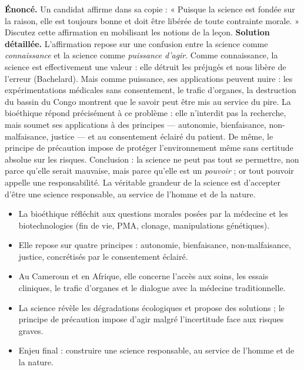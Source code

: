 \documentclass[11pt]{article}
\begin{document}
\begin{exoresolu}
\textbf{Énoncé.} Un candidat affirme dans sa copie : « Puisque la science est fondée sur la raison, elle est toujours bonne et doit être libérée de toute contrainte morale. » Discutez cette affirmation en mobilisant les notions de la leçon.
\tcblower
\textbf{Solution détaillée.} L'affirmation repose sur une confusion entre la science comme \emph{connaissance} et la science comme \emph{puissance d'agir}. Comme connaissance, la science est effectivement une valeur : elle détruit les préjugés et nous libère de l'erreur (Bachelard). Mais comme puissance, ses applications peuvent nuire : les expérimentations médicales sans consentement, le trafic d'organes, la destruction du bassin du Congo montrent que le savoir peut être mis au service du pire. La bioéthique répond précisément à ce problème : elle n'interdit pas la recherche, mais soumet ses applications à des principes — autonomie, bienfaisance, non-malfaisance, justice — et au consentement éclairé du patient. De même, le principe de précaution impose de protéger l'environnement même sans certitude absolue sur les risques. Conclusion : la science ne peut pas tout se permettre, non parce qu'elle serait mauvaise, mais parce qu'elle est un \emph{pouvoir} ; or tout pouvoir appelle une responsabilité. La véritable grandeur de la science est d'accepter d'être une science responsable, au service de l'homme et de la nature.
\end{exoresolu}

\begin{aretenir}
\begin{itemize}
\item La bioéthique réfléchit aux questions morales posées par la médecine et les biotechnologies (fin de vie, PMA, clonage, manipulations génétiques).
\item Elle repose sur quatre principes : autonomie, bienfaisance, non-malfaisance, justice, concrétisés par le consentement éclairé.
\item Au Cameroun et en Afrique, elle concerne l'accès aux soins, les essais cliniques, le trafic d'organes et le dialogue avec la médecine traditionnelle.
\item La science révèle les dégradations écologiques et propose des solutions ; le principe de précaution impose d'agir malgré l'incertitude face aux risques graves.
\item Enjeu final : construire une science responsable, au service de l'homme et de la nature.
\end{itemize}
\end{aretenir}
\end{document}
